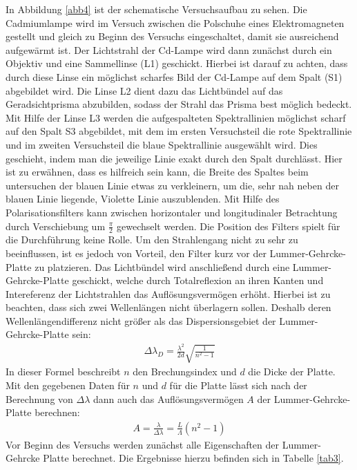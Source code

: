 In Abbildung \ref{abb4} ist der schematische Versuchsaufbau zu sehen. Die Cadmiumlampe
wird im Versuch zwischen die Polschuhe eines Elektromagneten gestellt und gleich zu
Beginn des Versuchs eingeschaltet, damit sie ausreichend aufgewärmt ist.
Der Lichtstrahl der Cd-Lampe wird dann zunächst durch ein Objektiv und eine Sammellinse (L1)
geschickt. Hierbei ist darauf zu achten, dass durch diese Linse ein möglichst scharfes
Bild der Cd-Lampe auf dem Spalt (S1) abgebildet wird. Die Linse L2 dient dazu das Lichtbündel
auf das Geradsichtprisma abzubilden, sodass der Strahl das Prisma best möglich bedeckt.
Mit Hilfe der Linse L3 werden die aufgespalteten Spektrallinien möglichst scharf auf den
Spalt S3 abgebildet, mit dem im ersten Versuchsteil die rote Spektrallinie und im zweiten
Versuchsteil die blaue Spektrallinie ausgewählt wird. Dies geschieht, indem man die jeweilige
Linie exakt durch den Spalt durchlässt. Hier ist zu erwähnen, dass es hilfreich sein kann, die
Breite des Spaltes beim untersuchen der blauen Linie etwas zu verkleinern, um die, sehr nah neben
der blauen Linie liegende, Violette Linie auszublenden.
Mit Hilfe des Polarisationsfilters kann zwischen horizontaler und longitudinaler Betrachtung durch
Verschiebung um $\frac{\pi}{2}$ gewechselt werden. Die Position des Filters spielt für die Durchführung
keine Rolle. Um den Strahlengang nicht zu sehr zu beeinflussen, ist es jedoch von Vorteil, den Filter
kurz vor der Lummer-Gehrcke-Platte zu platzieren.
Das Lichtbündel wird anschließend durch eine Lummer-Gehrcke-Platte geschickt, welche durch
Totalreflexion an ihren Kanten und Intereferenz der Lichtstrahlen das Auflösungsvermögen erhöht.
Hierbei ist zu beachten, dass sich zwei Wellenlängen nicht überlagern sollen. Deshalb deren
Wellenlängendifferenz nicht größer als das Dispersionsgebiet der Lummer-Gehrcke-Platte sein:
\begin{align*}
    \Delta \lambda_D =\frac{\lambda^2}{2d}\sqrt{\frac{1}{n^2-1}}
    \label{eq:dis}
\end{align*}
In dieser Formel beschreibt $n$ den Brechungsindex und $d$ die Dicke der Platte.
Mit den gegebenen Daten für $n$ und $d$ für die Platte lässt sich nach der Berechnung von
$\Delta \lambda$ dann auch das Auflösungsvermögen $A$ der Lummer-Gehrcke-Platte berechnen:
\begin{align*}
    A = \frac{\lambda}{\Delta\lambda}=\frac{L}{\Lambda}(n^2-1)
\end{align*}
Vor Beginn des Versuchs werden zunächst alle Eigenschaften der Lummer-Gehrcke Platte berechnet.
Die Ergebnisse hierzu befinden sich in Tabelle \ref{tab3}.

